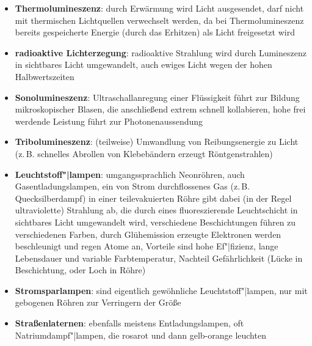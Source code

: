 \begin{itemize}
    \item
    \textbf{Thermolumineszenz}:
    durch Erwärmung wird Licht ausgesendet,
    darf nicht mit thermischen Lichtquellen verwechselt werden,
    da bei Thermolumineszenz bereits gespeicherte Energie (durch das Erhitzen)
    als Licht freigesetzt wird
    
    \item
    \textbf{radioaktive Lichterzegung}:
    radioaktive Strahlung wird durch Lumineszenz in sichtbares Licht
    umgewandelt,
    auch ewiges Licht wegen der hohen Halbwertszeiten
    
    \item
    \textbf{Sonolumineszenz}:
    Ultraschallanregung einer Flüssigkeit führt zur Bildung mikroskopischer
    Blasen, die anschließend extrem schnell kollabieren,
    hohe frei werdende Leistung führt zur Photonenaussendung
    
    \item
    \textbf{Tribolumineszenz}:
    (teilweise) Umwandlung von Reibungsenergie zu Licht
    (z.\,B. schnelles Abrollen von Klebebändern erzeugt Röntgenstrahlen)
\end{itemize}
\linie
\begin{itemize}
    \item
    \textbf{Leuchtstoff"|lampen}:
    umgangssprachlich Neonröhren, auch Gasentladungslampen,
    ein von Strom durchflossenes Gas (z.\,B. Quecksilberdampf) in einer
    teilevakuierten Röhre gibt dabei (in der Regel ultraviolette)
    Strahlung ab,
    die durch eines fluoreszierende Leuchtschicht in sichtbares Licht
    umgewandelt wird,
    verschiedene Beschichtungen führen zu verschiedenen Farben,
    durch Glühemission erzeugte Elektronen werden beschleunigt und
    regen Atome an,
    Vorteile sind hohe Ef"|fizienz, lange Lebensdauer und variable
    Farbtemperatur,
    Nachteil Gefährlichkeit (Lücke in Beschichtung, oder Loch in Röhre)
    
    \item
    \textbf{Stromsparlampen}:
    sind eigentlich gewöhnliche Leuchtstoff"|lampen, nur mit gebogenen
    Röhren zur Verringern der Größe
    
    \item
    \textbf{Straßenlaternen}:
    ebenfalls meistens Entladungslampen,
    oft Natriumdampf"|lampen, die rosarot und dann gelb-orange leuchten
\end{itemize}
\linie
\pagebreak
